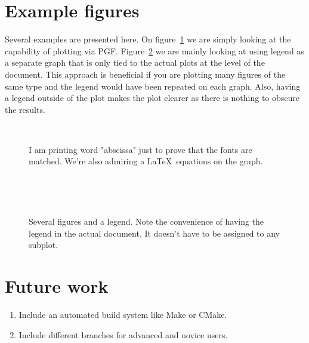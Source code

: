 \documentclass[a4paper,12pt]{article}
\begin{document}
\section{Example figures}

Several examples are presented here. On figure~\ref{fig:latex} we are simply
looking at the capability of plotting via PGF\@. Figure~\ref{fig:several} we are
mainly looking at using legend as a separate graph that is only tied to the actual
plots at the level of the document. This approach is beneficial if you are
plotting many figures of the same type and the legend would have been repeated
on each graph. Also, having a legend outside of the plot makes the plot clearer
as there is nothing to obscure the results.


\begin{figure}[t]
  \centering
  
  \\
  \caption{I am printing word "abscissa" just to prove that the fonts are
  matched. We're also admiring a \LaTeX\ equations on the graph.}
  \label{fig:latex}
\end{figure}
\begin{figure}[p]
  \begin{center}
    
    
    \\
    \vspace{5mm}
    
    
    \\
    
  \end{center}
  \caption{Several figures and a legend. Note the convenience of having the
  legend in the actual document. It doesn't have to be assigned to any subplot.}
  \label{fig:several}
\end{figure}

\section{Future work}
\begin{enumerate}
  \item Include an automated build system like Make or CMake.
  \item Include different branches for advanced and novice users.
\end{enumerate}

\printbibliography
\end{document}
